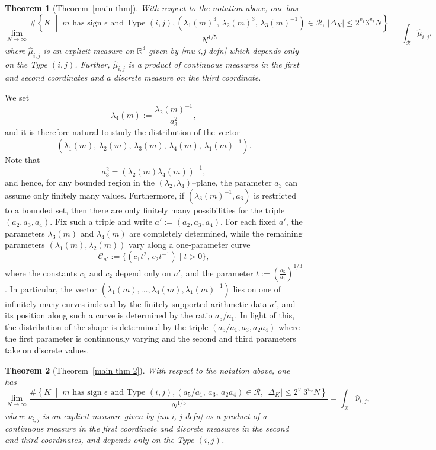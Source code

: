 \documentclass[table]{amsart}
\newtheorem{lthm}{Theorem}
\numberwithin{equation}{section}
\begin{document}
\begin{lthm}[Theorem~\ref{main thm}]
With respect to the notation above, one has
\[
\lim_{N\rightarrow \infty}
\frac{
\#\left\{
K \;\middle|\;
m \text{ has sign } \epsilon \text{ and Type } (i,j),
(\lambda_1(m)^3,\, \lambda_2(m)^3,\, \lambda_3(m)^{-1})\in \mathscr{R},\,
|\Delta_K|\le 2^{v_1}3^{v_2}N
\right\}
}{N^{1/5}}
=
\int_{\mathscr{R}} \hat{\mu}_{i,j},
\]
where $\hat{\mu}_{i,j}$ is an explicit measure on $\mathbb{R}^3$ given by \eqref{mu i,j defn} which depends only on the Type $(i,j)$. Further, $\hat{\mu}_{i,j}$ is a product of continuous measures in the first and second coordinates and a discrete measure on the third coordinate.
\end{lthm}

\par
We set
\[
\lambda_4(m):=\frac{\lambda_2(m)^{-1}}{a_3^2},
\]
and it is therefore natural to study the distribution of the vector
\[
(\lambda_1(m),\, \lambda_2(m),\, \lambda_3(m),\, \lambda_4(m),\, \lambda_1(m)^{-1}).
\]
Note that
\[
a_3^2=(\lambda_2(m)\lambda_4(m))^{-1},
\]
and hence, for any bounded region in the $(\lambda_2,\lambda_4)$--plane, the parameter $a_3$ can assume only finitely many values. Furthermore, if $(\lambda_3(m)^{-1},a_3)$ is restricted to a bounded set, then there are only finitely many possibilities for the triple $(a_2,a_3,a_4)$. Fix such a triple and write $a':=(a_2,a_3,a_4)$. For each fixed $a'$, the parameters $\lambda_3(m)$ and $\lambda_4(m)$ are completely determined, while the remaining parameters $(\lambda_1(m),\lambda_2(m))$ vary along a one-parameter curve
\[
\mathcal{C}_{a'}:=\{(c_1 t^2,\, c_2 t^{-1}) \mid t>0\},
\]
where the constants $c_1$ and $c_2$ depend only on $a'$, and the parameter $t:=\left(\frac{a_5}{a_1}\right)^{1/3}$. In particular, the vector $(\lambda_1(m),\dots,\lambda_4(m), \lambda_1(m)^{-1})$ lies on one of infinitely many curves indexed by the finitely supported arithmetic data $a'$, and its position along such a curve is determined by the ratio $a_5/a_1$. In light of this, the distribution of the shape is determined by the triple $(a_5/a_1, a_3, a_2a_4)$ where the first parameter is continuously varying and the second and third parameters take on discrete values. 

\begin{lthm}[Theorem~\ref{main thm 2}]
With respect to the notation above, one has
\[
\lim_{N\rightarrow \infty}
\frac{
\#\left\{
K \;\middle|\;
m \text{ has sign } \epsilon \text{ and Type } (i,j),
(a_5/a_1,\, a_3,\, a_2a_4)\in \mathscr{R},\,
|\Delta_K|\le 2^{v_1}3^{v_2}N
\right\}
}{N^{1/5}}
=
\int_{\mathscr{R}} \hat{\nu}_{i,j},
\]
where $\hat{\nu}_{i,j}$ is an explicit measure given by \eqref{nu i, j defn} as a product of a continuous measure in the first coordinate and discrete measures in the second and third coordinates, and depends only on the Type $(i,j)$.
\end{lthm}
\end{document}
